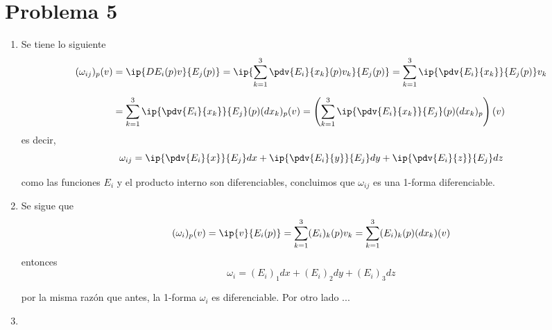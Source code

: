 \documentclass{article}
\begin{document}
\section*{Problema 5}
\begin{enumerate}
    \item Se tiene lo siguiente
    \begin{align*}
        (\omega_{ij})_{p}(v) &= \ip{DE_{i}(p)v}{E_{j}(p)}
        =\ip{\sum_{k=1}^{3}\pdv{E_{i}}{x_{k}}(p)v_{k}}{E_{j}(p)}
        =\sum_{k=1}^{3}\ip{\pdv{E_{i}}{x_{k}}}{E_{j}(p)}v_{k} \\[2mm]
        &= \sum_{k=1}^{3}\ip{\pdv{E_{i}}{x_{k}}}{E_{j}}(p)(dx_{k})_{p}(v)
        =\left(\sum_{k=1}^{3}\ip{\pdv{E_{i}}{x_{k}}}{E_{j}}(p)(dx_{k})_{p}\right)(v)
    \end{align*}
    es decir,
    \begin{equation*}
        \omega_{ij}=\ip{\pdv{E_{i}}{x}}{E_{j}}dx+\ip{\pdv{E_{i}}{y}}{E_{j}}dy
        +\ip{\pdv{E_{i}}{z}}{E_{j}}dz
    \end{equation*}
    
    como las funciones $E_{i}$ y el producto interno son diferenciables, concluimos que 
    $\omega_{ij}$ es una 1-forma diferenciable.

    \item Se sigue que
    \begin{align*}
        (\omega_{i})_{p}(v)=\ip{v}{E_{i}(p)}=\sum_{k=1}^{3}(E_{i})_{k}(p)v_{k}
        =\sum_{k=1}^{3}(E_{i})_{k}(p)(dx_{k})(v)
    \end{align*}
    entonces
    \begin{equation*}
        \omega_{i}=(E_{i})_{1}dx+(E_{i})_{2}dy+(E_{i})_{3}dz
    \end{equation*}
    
    por la misma razón que antes, la 1-forma $\omega_{i}$ es diferenciable. Por otro lado ...

    \item 
\end{enumerate}

\end{document}
